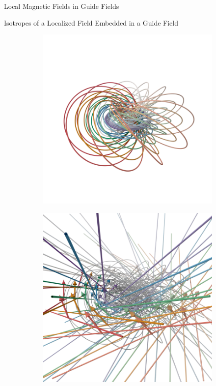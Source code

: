 \documentclass[final]{beamer}
\newlength{\onecolwid}
\begin{document}
\begin{frame}[t]
\begin{columns}[t]
\begin{column}{\onecolwid}
\begin{block}{\huge{Local Magnetic Fields in Guide Fields}}
\begin{block}{Isotropes of a Localized Field Embedded in a Guide Field}
\begin{figure}
\begin{subfigure}[b]{.42\textwidth}
      \includegraphics[width=\textwidth]{fig/onlyhopf.png}
      \caption{}
    \end{subfigure}
    \begin{subfigure}[b]{.42\textwidth}
      \includegraphics[width=\textwidth]{fig/hopftropes.png}

\end{subfigure}
\end{figure}
\end{block}
\end{block}
\end{column}
\end{columns}
\end{frame}
\end{document}
